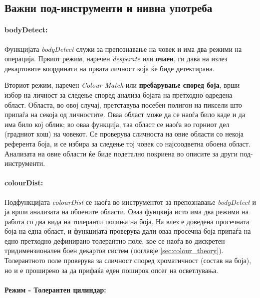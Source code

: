 \documentclass[12pt]{article}
\begin{document}
  \subsection{Важни под-инструменти и нивна употреба}
  \label{sec:bodydetect}
    \paragraph{bodyDetect:\\}
      Функцијата \textit{bodyDetect} служи за препознавање на човек и има два режими на операција. Првиот режим, наречен \textit{desperate} или \textbf{очаен}, ги дава на излез декартовите координати на првата личност која ќе биде детектирана.

      Вториот режим, наречен \textit{Colour Match} или \textbf{пребарување според боја}, врши избор на личност за следење според анализа бојата на претходно одредена област. Областа, во овој случај, претставува посебен полигон на пиксели што припаѓа на секоја од личностите. Оваа област може да се наоѓа било каде и да има било кој облик; во оваа функција, таа област се наоѓа во горниот дел (градниот кош) на човекот. Се проверува сличноста на овие области со некоја референта боја, и се избира за следење тој човек со најсоодветна обоена област. Анализата на овие области ќе биде подетално покриена во описите за други под-инструменти.

    \paragraph{colourDist:\\}

      Подфункцијата \textit{colourDist} се наоѓа во инструментот за препознавање \textit{bodyDetect} и ја врши анализата на обоените области. Оваа фунцкија исто има два режими на работа со два вида на толеранти полиња на боја. На влез е доведена просечната боја на една област, и функцијата проверува дали оваа просечна боја припаѓа на едно претходно дефинирано толерантно поле, кое се наоѓа во дискретен тридимензионален боен декартов систем (поглавје \ref{sec:colour_theory}). Толерантното поле проверува за сличност според хроматичност (состав на боја), но и е проширено за да прифаќа еден поширок опсег на осветлувања.

      \paragraph{Режим - Толерантен цилиндар:\\}
\end{document}
